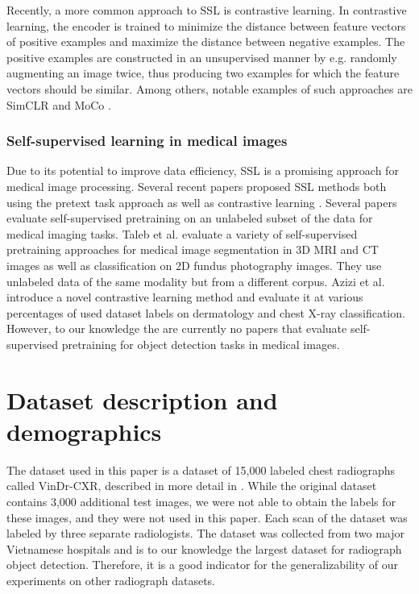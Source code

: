 \documentclass[conference]{IEEEtran}
\begin{document}
Recently, a more common approach to SSL is contrastive learning.
In contrastive learning, the encoder is trained to minimize the distance between feature
vectors of positive examples and maximize the distance between negative examples. The
positive examples are constructed in an unsupervised manner by e.g. randomly augmenting
an image twice, thus producing two examples for which the feature vectors should be
similar. Among others, notable examples of such approaches are SimCLR 
\cite{chenSimpleFrameworkContrastive2020} and MoCo \cite{he2019moco}.

\subsubsection{Self-supervised learning in medical images}

Due to its potential to improve data efficiency, SSL is a promising
approach for medical image processing. Several recent
papers proposed SSL methods both using the pretext task approach 
\cite{baiSelfSupervisedLearningCardiac2019, ZHU2020101746} as well as contrastive
learning \cite{zhouComparingLearnSurpassing2020}. Several papers evaluate self-supervised 
pretraining on an unlabeled subset of the data for medical
imaging tasks. Taleb et al. \cite{NEURIPS2020_d2dc6368} evaluate a variety of 
self-supervised pretraining approaches
for medical image segmentation in 3D MRI and CT images as well as classification on 2D 
fundus photography images. They use unlabeled data of the same modality but from a 
different corpus. Azizi et al. \cite{aziziBigSelfSupervisedModels2021} introduce a
novel contrastive learning method and evaluate it at various percentages of used
dataset labels on dermatology and chest X-ray classification. However, to 
our knowledge the are currently no papers that evaluate self-supervised 
pretraining for object detection tasks in medical images.

\section{Dataset description and demographics}\label{dataset}

The dataset used in this paper is a dataset of 15,000 labeled chest radiographs called VinDr-CXR, 
described in more detail in \cite{nguyenVinDrCXROpenDataset2021}. While the original dataset 
contains 3,000 additional test images, we were not able to obtain the labels for these images, and 
they were not used in this paper. Each scan of the dataset was labeled by three separate 
radiologists. The dataset was collected from two major Vietnamese hospitals and is to our
knowledge the largest dataset for radiograph object detection. Therefore, it is a good indicator
for the generalizability of our experiments on other radiograph datasets.
\end{document}
